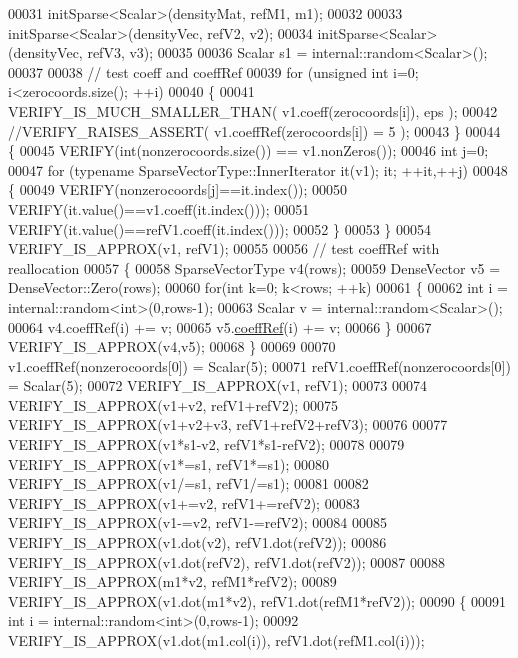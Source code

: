 \begin{DoxyCode}
00031   initSparse<Scalar>(densityMat, refM1, m1);
00032 
00033   initSparse<Scalar>(densityVec, refV2, v2);
00034   initSparse<Scalar>(densityVec, refV3, v3);
00035 
00036   Scalar s1 = internal::random<Scalar>();
00037 
00038   \textcolor{comment}{// test coeff and coeffRef}
00039   \textcolor{keywordflow}{for} (\textcolor{keywordtype}{unsigned} \textcolor{keywordtype}{int} i=0; i<zerocoords.size(); ++i)
00040   \{
00041     VERIFY\_IS\_MUCH\_SMALLER\_THAN( v1.coeff(zerocoords[i]), eps );
00042     \textcolor{comment}{//VERIFY\_RAISES\_ASSERT( v1.coeffRef(zerocoords[i]) = 5 );}
00043   \}
00044   \{
00045     VERIFY(\textcolor{keywordtype}{int}(nonzerocoords.size()) == v1.nonZeros());
00046     \textcolor{keywordtype}{int} j=0;
00047     \textcolor{keywordflow}{for} (\textcolor{keyword}{typename} SparseVectorType::InnerIterator it(v1); it; ++it,++j)
00048     \{
00049       VERIFY(nonzerocoords[j]==it.index());
00050       VERIFY(it.value()==v1.coeff(it.index()));
00051       VERIFY(it.value()==refV1.coeff(it.index()));
00052     \}
00053   \}
00054   VERIFY\_IS\_APPROX(v1, refV1);
00055   
00056   \textcolor{comment}{// test coeffRef with reallocation}
00057   \{
00058     SparseVectorType v4(rows);
00059     DenseVector v5 = DenseVector::Zero(rows);
00060     \textcolor{keywordflow}{for}(\textcolor{keywordtype}{int} k=0; k<rows; ++k)
00061     \{
00062       \textcolor{keywordtype}{int} i = internal::random<int>(0,rows-1);
00063       Scalar v = internal::random<Scalar>();
00064       v4.coeffRef(i) += v;
00065       v5.\hyperlink{class_eigen_1_1_plain_object_base_a25626a55b26a4323565f79d1b7c48ea8}{coeffRef}(i) += v;
00066     \}
00067     VERIFY\_IS\_APPROX(v4,v5);
00068   \}
00069 
00070   v1.coeffRef(nonzerocoords[0]) = Scalar(5);
00071   refV1.coeffRef(nonzerocoords[0]) = Scalar(5);
00072   VERIFY\_IS\_APPROX(v1, refV1);
00073 
00074   VERIFY\_IS\_APPROX(v1+v2, refV1+refV2);
00075   VERIFY\_IS\_APPROX(v1+v2+v3, refV1+refV2+refV3);
00076 
00077   VERIFY\_IS\_APPROX(v1*s1-v2, refV1*s1-refV2);
00078 
00079   VERIFY\_IS\_APPROX(v1*=s1, refV1*=s1);
00080   VERIFY\_IS\_APPROX(v1/=s1, refV1/=s1);
00081 
00082   VERIFY\_IS\_APPROX(v1+=v2, refV1+=refV2);
00083   VERIFY\_IS\_APPROX(v1-=v2, refV1-=refV2);
00084 
00085   VERIFY\_IS\_APPROX(v1.dot(v2), refV1.dot(refV2));
00086   VERIFY\_IS\_APPROX(v1.dot(refV2), refV1.dot(refV2));
00087 
00088   VERIFY\_IS\_APPROX(m1*v2, refM1*refV2);
00089   VERIFY\_IS\_APPROX(v1.dot(m1*v2), refV1.dot(refM1*refV2));
00090   \{
00091     \textcolor{keywordtype}{int} i = internal::random<int>(0,rows-1);
00092     VERIFY\_IS\_APPROX(v1.dot(m1.col(i)), refV1.dot(refM1.col(i)));

\end{DoxyCode}
